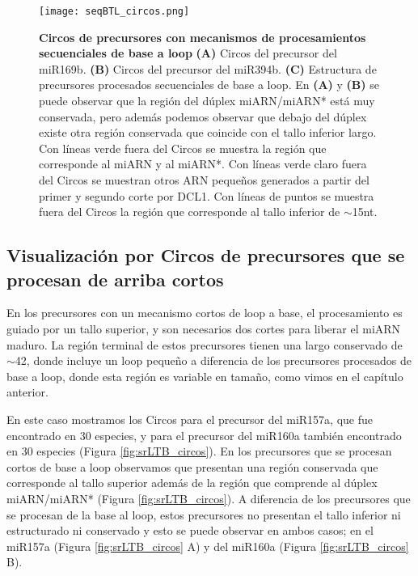 \begin{landscape}
    \begin{figure}[htbp!] 
        \centering    
        \texttt{[image: seqBTL\_circos.png]}
        \caption[Circos de precursores con mecanismos de procesamientos secuenciales de base a loop]{
        \textbf{Circos de precursores con mecanismos de procesamientos secuenciales de base a loop}
		 \textbf{(A)} Circos del precursor del miR169b.
		 \textbf{(B)} Circos del precursor del miR394b.
		 \textbf{(C)} Estructura de precursores procesados secuenciales de base a loop.
		 En \textbf{(A)} y \textbf{(B)} se puede observar que la región del dúplex miARN/miARN* está muy conservada, pero además podemos observar que debajo del dúplex existe otra región conservada que coincide con el tallo inferior largo.
        Con líneas verde fuera del Circos se muestra la región que corresponde al miARN y al miARN*. 
        Con líneas verde claro fuera del Circos se muestran otros ARN pequeños  generados a partir del primer y segundo corte por DCL1.
        Con líneas de puntos se muestra fuera del Circos la región que corresponde al tallo inferior de $\sim$15nt.
		}
         \label{fig:seqBTL_circos}
    \end{figure}
\end{landscape}


\subsection{Visualización por Circos de precursores que se procesan de arriba cortos}

En los precursores con un mecanismo cortos de loop a base, el procesamiento es guiado por un tallo superior, y son necesarios dos cortes para liberar el miARN maduro.
La región terminal de estos precursores tienen una largo conservado de $\sim$42, donde incluye un loop pequeño \citep{Bologna2013} a diferencia de los precursores procesados de base a loop, donde esta región es variable en tamaño, como vimos en el capítulo anterior.

En este caso mostramos los Circos para el precursor del miR157a, que fue encontrado en 30 especies, y para el precursor del miR160a también encontrado en 30 especies (Figura \ref{fig:srLTB_circos}). 
En los precursores que se procesan cortos de base a loop observamos que presentan una región conservada que corresponde al tallo superior además de la región que comprende al dúplex miARN/miARN* (Figura \ref{fig:srLTB_circos}).
A diferencia de los precursores que se procesan de la base al loop, estos precursores no presentan el tallo inferior ni estructurado ni conservado y esto se puede observar en ambos casos; en el miR157a (Figura \ref{fig:srLTB_circos} A) y del miR160a (Figura \ref{fig:srLTB_circos} B).


